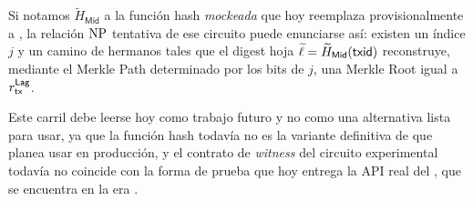 Si notamos $\widetilde{H}_{\mathsf{Mid}}$ a la función hash \emph{mockeada} que hoy reemplaza provisionalmente a \MidnightPoseidonHash, la relación $\mathrm{NP}$ tentativa de ese circuito puede enunciarse así: existen un índice $j$ y un camino de hermanos tales que el digest hoja $\widetilde{\ell} = \widetilde{H}_{\mathsf{Mid}}(\mathsf{txid})$ reconstruye, mediante el Merkle Path determinado por los bits de $j$, una Merkle Root igual a $r_{\mathsf{tx}}^{\mathsf{Lag}}$.

Este carril debe leerse hoy como trabajo futuro y no como una alternativa lista para usar, ya que la función hash todavía no es la variante definitiva de \MidnightPoseidonHash que \Mithril planea usar en producción, y el contrato de \textit{witness} del circuito experimental todavía no coincide con la forma de prueba que hoy entrega la API real del \MithrilAggregator, que se encuentra en la era \Pythagoras.
